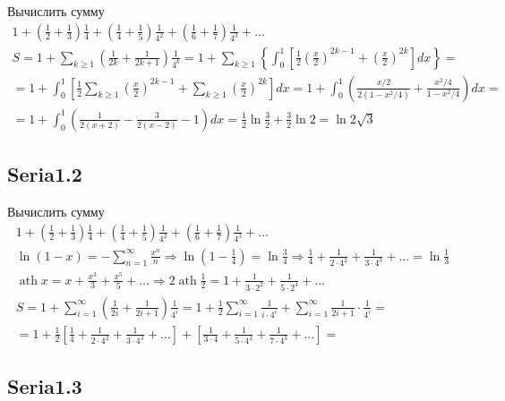 	Вычислить сумму
	$$
	\begin{gathered}
		1+\left(\frac{1}{2}+\frac{1}{3}\right) \frac{1}{4}+\left(\frac{1}{4}+\frac{1}{5}\right) \frac{1}{4^2}+\left(\frac{1}{6}+\frac{1}{7}\right) \frac{1}{4^3}+\ldots \\
		S=1+\sum_{k \geq 1}\left(\frac{1}{2 k}+\frac{1}{2 k+1}\right) \frac{1}{4^k}=1+\sum_{k \geq 1}\left\{\int_0^1\left[\frac{1}{2}\left(\frac{x}{2}\right)^{2 k-1}+\left(\frac{x}{2}\right)^{2 k}\right] d x\right\}= \\
		=1+\int_0^1\left[\frac{1}{2} \sum_{k \geq 1}\left(\frac{x}{2}\right)^{2 k-1}+\sum_{k \geq 1}\left(\frac{x}{2}\right)^{2 k}\right] d x=1+\int_0^1\left(\frac{x / 2}{2\left(1-x^2 / 4\right)}+\frac{x^2 / 4}{1-x^2 / 4}\right) d x= \\
		=1+\int_0^1\left(\frac{1}{2(x+2)}-\frac{3}{2(x-2)}-1\right) d x=\frac{1}{2} \ln \frac{3}{2}+\frac{3}{2} \ln 2=\ln 2 \sqrt{3}
	\end{gathered}
	$$
	
	\subsection{Seria1.2}
	
	Вычислить сумму
	$$
	\begin{gathered}
		1+\left(\frac{1}{2}+\frac{1}{3}\right) \frac{1}{4}+\left(\frac{1}{4}+\frac{1}{5}\right) \frac{1}{4^2}+\left(\frac{1}{6}+\frac{1}{7}\right) \frac{1}{4^3}+\ldots \\
		\ln (1-x)=-\sum_{n=1}^{\infty} \frac{x^n}{n} \Rightarrow \ln \left(1-\frac{1}{4}\right)=\ln \frac{3}{4} \Rightarrow \frac{1}{4}+\frac{1}{2 \cdot 4^2}+\frac{1}{3 \cdot 4^3}+\ldots=\ln \frac{1}{3} \\
		\operatorname{ath} x=x+\frac{x^3}{3}+\frac{x^5}{5}+\ldots \Rightarrow 2 \operatorname{ath} \frac{1}{2}=1+\frac{1}{3 \cdot 2^2}+\frac{1}{5 \cdot 2^4}+\ldots \\
		S=1+\sum_{i=1}^{\infty}\left(\frac{1}{2 i}+\frac{1}{2 i+1}\right) \frac{1}{4^i}=1+\frac{1}{2} \sum_{i=1}^{\infty} \frac{1}{i \cdot 4^i}+\sum_{i=1}^{\infty} \frac{1}{2 i+1} \cdot \frac{1}{4^i}= \\
		=1+\frac{1}{2}\left[\frac{1}{4}+\frac{1}{2 \cdot 4^2}+\frac{1}{3 \cdot 4^3}+\ldots\right]+\left[\frac{1}{3 \cdot 4}+\frac{1}{5 \cdot 4^2}+\frac{1}{7 \cdot 4^3}+\ldots\right]=
	\end{gathered}
	$$
	
	\subsection{Seria1.3}
	

